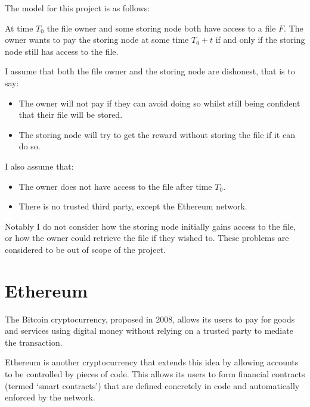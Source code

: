\documentclass[12pt,a4paper,twoside,openright]{report}
\begin{document}
The model for this project is as follows:

At time $T_0$ the file owner and some storing node both have access to a file $F$. The owner wants to pay the storing node
at some time $T_0 + t$ if and only if the storing node still has access to the file.

I assume that both the file owner and the storing node are dishonest, that is to say:
\begin{itemize}
\item The owner will not pay if they can avoid doing so whilst still being confident that their file will be stored.
\item The storing node will try to get the reward without storing the file if it can do so.
\end{itemize}
I also assume that:
\begin{itemize}
\item The owner does not have access to the file after time $T_0$.
\item There is no trusted third party, except the Ethereum network.
\end{itemize}

Notably I do not consider how the storing node initially gains access to the file, or how the owner could retrieve the file if they wished to.
These problems are considered to be out of scope of the project.



\section{Ethereum}

The Bitcoin cryptocurrency, proposed in 2008, allows its users to pay for goods and services using digital money
without relying on a trusted party to mediate the transaction.

Ethereum is another cryptocurrency that extends this idea by allowing accounts to be controlled by pieces of code.
This allows its users to form financial contracts (termed `smart contracts') that are defined concretely in code and automatically enforced by the network.
\end{document}
